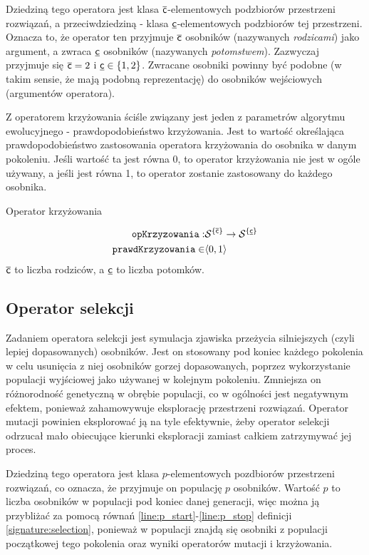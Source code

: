 \documentclass[./FM_mgr.tex]{subfiles}
\begin{document}
Dziedziną tego operatora jest klasa $\mathsf{\overline{c}}$-elementowych podzbiorów przestrzeni rozwiązań, a przeciwdziedziną - klasa $\mathsf{\underline{c}}$-elementowych podzbiorów tej przestrzeni. 
Oznacza to, że operator ten przyjmuje $\mathsf{\overline{c}}$ osobników (nazywanych \emph{rodzicami}) jako argument, a zwraca $\mathsf{\underline{c}}$ osobników (nazywanych \emph{potomstwem}). 
Zazwyczaj przyjmuje się $ \mathsf{\overline{c}} = 2 $ i $\mathsf{\underline{c}} \in \left\{1, 2 \right\}$. 
Zwracane osobniki powinny być podobne (w takim sensie, że mają podobną reprezentację) do osobników wejściowych (argumentów operatora). 

Z operatorem krzyżowania ściśle związany jest jeden z parametrów algorytmu ewolucyjnego - prawdopodobieństwo krzyżowania. Jest to wartość określająca prawdopodobieństwo zastosowania operatora krzyżowania do osobnika w danym pokoleniu. Jeśli wartość ta jest równa 0, to operator krzyżowania nie jest w ogóle używany, a jeśli jest równa 1, to operator zostanie zastosowany do każdego osobnika.

\begin{signature}
	\caption{Operator krzyżowania \label{signature:crossover}}
	\begin{align}
		\mathtt{opKrzyzowania}: & {\mathcal{S}}^{ \{ \mathsf{\overline{c}} \}} \rightarrow {\mathcal{S}}^{ \{ \mathsf{\underline{c}} \}} \\
		\mathtt{prawdKrzyzowania} \in & \langle0, 1\rangle
	\end{align}
	$\mathsf{\overline{c}}$ to liczba rodziców, a $\mathsf{\underline{c}}$ to liczba potomków.
\end{signature}	

\subsection{Operator selekcji} \label{subsection:natSel}

Zadaniem operatora selekcji jest symulacja zjawiska przeżycia silniejszych (czyli lepiej dopasowanych) osobników. Jest on stosowany pod koniec każdego pokolenia w celu usunięcia z niej osobników gorzej dopasowanych, poprzez wykorzystanie populacji wyjściowej jako używanej w kolejnym pokoleniu. Zmniejsza on różnorodność genetyczną w obrębie populacji, co w ogólności jest negatywnym efektem, ponieważ zahamowywuje  eksplorację przestrzeni rozwiązań. Operator mutacji powinien eksplorować ją na tyle efektywnie, żeby operator selekcji odrzucał mało obiecujące kierunki eksploracji zamiast całkiem zatrzymywać jej proces.

Dziedziną tego operatora jest klasa $p$-elementowych pozdbiorów przestrzeni rozwiązań, co oznacza, że przyjmuje on populację $p$ osobników. 
Wartość $p$ to liczba osobników w populacji pod koniec danej generacji, więc można ją przybliżać za pomocą równań \ref{line:p_start}-\ref{line:p_stop} definicji \ref{signature:selection}, ponieważ w populacji znajdą się osobniki z populacji początkowej tego pokolenia oraz wyniki operatorów mutacji i krzyżowania. 
\end{document}
